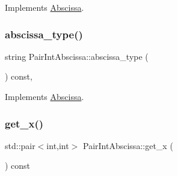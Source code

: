 Implements \mbox{\hyperlink{classAbscissa_af57ffcd07eee633bb2313bc7a932f3bb}{Abscissa}}.

\mbox{\label{classPairIntAbscissa_a7b186cfb2c2d44289b12f0ade56ea948}} 
\subsubsection{\texorpdfstring{abscissa\_type()}{abscissa\_type()}\hspace{0.1cm}{\footnotesize\ttfamily [2/2]}}
{\footnotesize\ttfamily string Pair\+Int\+Abscissa\+::abscissa\+\_\+type (\begin{DoxyParamCaption}{ }\end{DoxyParamCaption}) const\hspace{0.3cm}{\ttfamily [inline]}, {\ttfamily [virtual]}}



Implements \mbox{\hyperlink{classAbscissa_af57ffcd07eee633bb2313bc7a932f3bb}{Abscissa}}.

\mbox{\label{classPairIntAbscissa_ae07a07c11afd74fd1a2e4c5ca9178229}} 
\subsubsection{\texorpdfstring{get\_x()}{get\_x()}\hspace{0.1cm}{\footnotesize\ttfamily [1/2]}}
{\footnotesize\ttfamily std\+::pair$<$int,int$>$ Pair\+Int\+Abscissa\+::get\+\_\+x (\begin{DoxyParamCaption}{ }\end{DoxyParamCaption}) const\hspace{0.3cm}{\ttfamily [inline]}}

